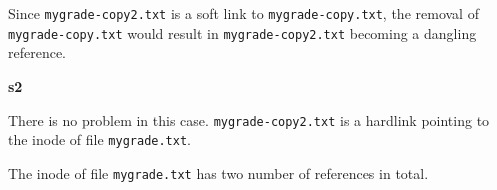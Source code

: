 \documentclass[12pt]{article}
\begin{document}
\begin{enumerate}[1.]
\begin{enumerate}[a)]
        \bigskip

        Since \texttt{mygrade-copy2.txt} is a soft link to \texttt{mygrade-copy.txt},
        the removal of \texttt{mygrade-copy.txt} would result in \texttt{mygrade-copy2.txt} becoming a dangling reference.

        \bigskip

        \textbf{s2}

        \bigskip

        There is no problem in this case. \texttt{mygrade-copy2.txt} is a hardlink
        pointing to the inode of file \texttt{mygrade.txt}.

        \bigskip

        The inode of file \texttt{mygrade.txt} has two number of references in total.


    \end{enumerate}


\end{enumerate}
\end{document}
